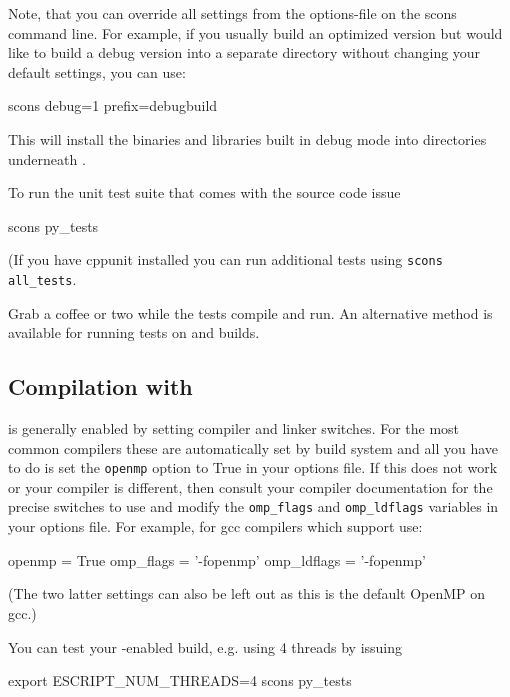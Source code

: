 Note, that you can override all settings from the options-file on the scons
command line. For example, if you usually build an optimized version but would
like to build a debug version into a separate directory without changing your
default settings, you can use:
\begin{shellCode}
scons debug=1 prefix=debugbuild
\end{shellCode}
This will install the binaries and libraries built in debug mode into
directories underneath .

To run the unit test suite that comes with the source code issue
\begin{shellCode}
scons py_tests
\end{shellCode}
(If you have cppunit installed you can run additional tests using \texttt{scons all_tests}.

Grab a coffee or two while the tests compile and run.
An alternative method is available for running tests on \openmp and \mpi builds.

\subsection{Compilation with \openmp}
\openmp is generally enabled by setting compiler and linker switches. For the
most common compilers these are automatically set by build system and all you
have to do is set the \texttt{openmp} option to True in your options file. If
this does not work or your compiler is different, then consult your compiler
documentation for the precise switches to use and modify the \texttt{omp_flags}
and \texttt{omp_ldflags} variables in your options file.
For example, for gcc compilers which support \openmp use:
\begin{shellCode}
openmp = True
omp_flags = '-fopenmp'
omp_ldflags = '-fopenmp'
\end{shellCode}
(The two latter settings can also be left out as this is the default OpenMP on gcc.)

You can test your \openmp-enabled build, e.g. using 4 threads by issuing
\begin{shellCode}
export ESCRIPT_NUM_THREADS=4
scons py_tests
\end{shellCode}

